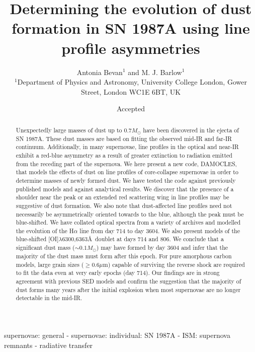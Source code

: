 \documentclass[useAMS,usenatbib,usegraphicx]{mnras}
\title[Determining the evolution of dust formation in SN 1987A using line profile asymmetries]{Determining the evolution of dust formation in SN 1987A using line profile asymmetries}
\author[Antonia Bevan and M. J. Barlow]{Antonia Bevan$^{1}$ and M. J. Barlow$^{1}$\\
$^{1}$Department of Physics and Astronomy, University College London, Gower Street, London WC1E 6BT, UK}
\begin{document}
\date{Accepted}

\pagerange{\pageref{firstpage}--\pageref{lastpage}} 

\maketitle

\label{firstpage}

\begin{abstract}
Unexpectedly large masses of dust up to $0.7M_{\odot}$ have been discovered in the ejecta of SN 1987A.  These dust masses are based on fitting the observed mid-IR and far-IR continuum.  Additionally, in many supernovae, line profiles in the optical and near-IR exhibit a red-blue asymmetry as a result of greater extinction to radiation emitted from the receding part of the supernova.  We here present a new code, DAMOCLES, that models the effects of dust on line profiles of core-collapse supernovae in order to determine masses of newly formed dust.  We have tested the code against previously published models and against analytical results.  We discover that the presence of a shoulder near the peak or an extended red scattering wing in line profiles may be suggestive of dust formation.  We also note that dust-affected line profiles need not necessarily be asymmetrically oriented towards to the blue, although the peak must be blue-shifted. We have collated optical spectra from a variety of archives and modelled the evolution of the H$\alpha$ line from day 714 to day 3604.  We also present models of the blue-shifted [OI]$\lambda$6300,6363\AA\ doublet at days 714 and 806.  We conclude that a significant dust mass ($\sim 0.1M_{\odot}$) may have formed by day 3604 and infer that the majority of the dust mass must form after this epoch.  For pure amorphous carbon models, large grain sizes ($\geqslant 0.6\mu$m) capable of surviving the reverse shock are required to fit the data even at very early epochs (day 714).  Our findings are in strong agreement with previous SED models and confirm the suggestion that the majority of dust forms many years after the initial explosion when most supernovae are no longer detectable in the mid-IR.
\end{abstract}

\begin{keywords}
supernovae: general  -  supernovae: individual: SN 1987A  -  ISM: supernova remnants  - radiative transfer
\end{keywords}
\end{document}
